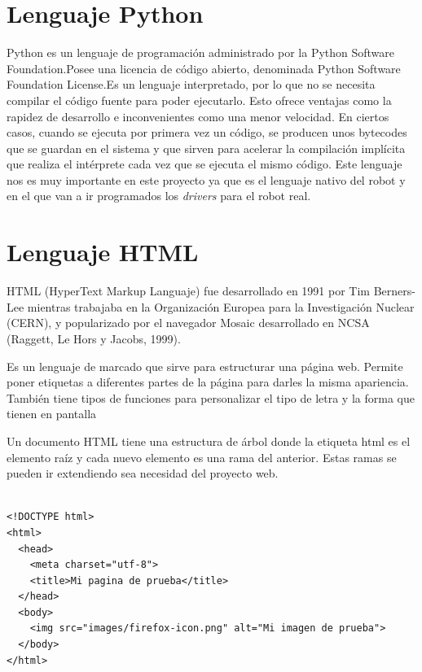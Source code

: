 \section{Lenguaje Python}

Python es un lenguaje de programación administrado por la Python Software Foundation.Posee una licencia de código abierto, denominada Python Software Foundation License.Es un lenguaje interpretado, por lo que no se necesita compilar el código fuente para poder ejecutarlo. Esto ofrece ventajas como la rapidez de desarrollo e inconvenientes como una menor velocidad. En ciertos casos, cuando se ejecuta por primera vez un código, se producen unos bytecodes que se guardan en el sistema y que sirven para acelerar la compilación implícita que realiza el intérprete cada vez que se ejecuta el mismo código. 
Este lenguaje nos es muy importante en este proyecto ya que es el lenguaje nativo del robot y en el que van a ir programados los \textit{drivers} para el robot real. 

\section{Lenguaje HTML}

HTML (HyperText Markup Languaje) fue desarrollado en 1991 por Tim Berners-Lee mientras trabajaba en la Organización Europea para la Investigación Nuclear (CERN), y popularizado por el navegador Mosaic desarrollado en NCSA (Raggett, Le Hors y Jacobs, 1999).

Es un lenguaje de marcado que sirve para estructurar una página web. Permite poner etiquetas a diferentes partes de la página para darles la misma apariencia. También tiene tipos de funciones para personalizar el tipo de letra y la forma que tienen en pantalla

Un documento HTML tiene una estructura de árbol  donde la etiqueta html es el elemento raíz y cada nuevo elemento es una rama del anterior. Estas ramas se pueden ir extendiendo sea necesidad del proyecto web.

\begin{lstlisting}[frame=single,breaklines=true, label=Ejemplo de funcionamiento HTTP, caption=Ejemplo de funcionamiento HTTP, captionpos=b]

<!DOCTYPE html>
<html>
  <head>
    <meta charset="utf-8">
    <title>Mi pagina de prueba</title>
  </head>
  <body>
    <img src="images/firefox-icon.png" alt="Mi imagen de prueba">
  </body>
</html>
\end{lstlisting}

